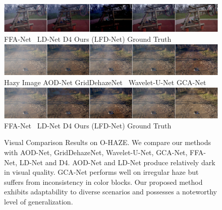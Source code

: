 \documentclass[lettersize,journal]{IEEEtran}
\begin{document}
\begin{figure}[ph!t]
    \includegraphics[width=16.5cm]{ohaze_2_2.jpg} \\
    FFA-Net\cite{qin2020ffa} \qquad\quad\, LD-Net\cite{ullah2021light} \qquad\qquad\;\; D4\cite{yang2022d4} \qquad\qquad\; Ours (LFD-Net) \qquad\quad Ground Truth \\
    
    \includegraphics[width=16.5cm]{ohaze_3_1.jpg} \\
    Hazy Image\qquad\quad\;\; AOD-Net\cite{li2017aod} \qquad GridDehazeNet\cite{liu2019griddehazenet} \;\, Wavelet-U-Net\cite{yang2019wavelet} \qquad GCA-Net\cite{chen2019gated}\\
    
    \includegraphics[width=16.5cm]{ohaze_3_2.jpg} \\
    FFA-Net\cite{qin2020ffa} \qquad\quad\, LD-Net\cite{ullah2021light} \qquad\qquad\;\; D4\cite{yang2022d4} \qquad\qquad\; Ours (LFD-Net) \qquad\quad Ground Truth \\
    
    \caption{Visual Comparison Results on O-HAZE. We compare our methods with AOD-Net\cite{li2017aod}, GridDehazeNet\cite{liu2019griddehazenet}, Wavelet-U-Net\cite{yang2019wavelet}, GCA-Net\cite{chen2019gated}, FFA-Net\cite{qin2020ffa}, LD-Net\cite{ullah2021light} and D4\cite{yang2022d4}. AOD-Net and LD-Net produce relatively dark in visual quality. GCA-Net performs well on irregular haze but suffers from inconsistency in color blocks. Our proposed method exhibits adaptability to diverse scenarios and possesses a noteworthy level of generalization. }
    \label{ohaze}
\end{figure}
\end{document}
